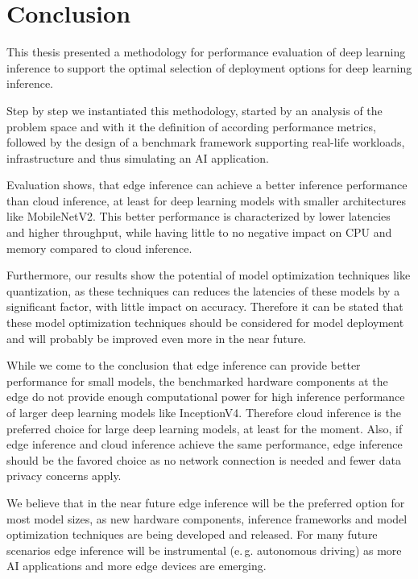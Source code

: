 \chapter{Conclusion}
\label{chap:conclusion}
%
This thesis presented a methodology for performance evaluation of deep learning inference to support the optimal selection of deployment options for deep learning inference.

Step by step we instantiated this methodology, started by an analysis of the problem space and with it the definition of according performance metrics, followed by the design of a benchmark framework supporting real-life workloads, infrastructure and thus simulating an AI application.

Evaluation shows, that edge inference can achieve a better inference performance than cloud inference, at least for deep learning models with smaller architectures like MobileNetV2.
This better performance is characterized by lower latencies and higher throughput, while having little to no negative impact on CPU and memory compared to cloud inference.

Furthermore, our results show the potential of model optimization techniques like quantization, as these techniques can reduces the latencies of these models by a significant factor, with little impact on accuracy.
Therefore it can be stated that these model optimization techniques should be considered for model deployment and will probably be improved even more in the near future.

While we come to the conclusion that edge inference can provide better performance for small models, the benchmarked hardware components at the edge do not provide enough computational power for high inference performance of larger deep learning models like InceptionV4.
Therefore cloud inference is the preferred choice for large deep learning models, at least for the moment.
Also, if edge inference and cloud inference achieve the same performance, edge inference should be the favored choice as no network connection is needed and fewer data privacy concerns apply.

We believe that in the near future edge inference will be the preferred option for most model sizes, as new hardware components, inference frameworks and model optimization techniques are being developed and released.
For many future scenarios edge inference will be instrumental (e.\,g. autonomous driving) as more AI applications and more edge devices are emerging.


